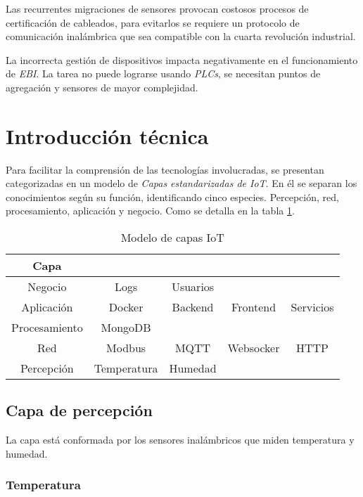 			Las recurrentes migraciones de sensores provocan costosos procesos de certificación de cableados, para evitarlos se requiere un protocolo de comunicación inalámbrica que sea compatible con la cuarta revolución industrial.
			
			La incorrecta gestión de dispositivos impacta negativamente en el funcionamiento de \emph{EBI}. La tarea no puede lograrse usando \emph{PLCs}, se necesitan puntos de agregación y sensores de mayor complejidad.

\section{Introducción técnica}
\label{introTecnica}

	Para facilitar la comprensión de las tecnologías involucradas, se presentan categorizadas en un modelo de \emph{Capas estandarizadas de IoT}. En él se separan los conocimientos según su función, identificando cinco especies. Percepción, red, procesamiento, aplicación y negocio. Como se detalla en la tabla \ref{tab:modeloCapas}.
	
	\begin{table}
		\centering
		\begin{tabular}{c|cccc}
			Capa 			& 				& 			& 			& 			\\ \hline
			Negocio 		& Logs 			& Usuarios 	& 			& 			\\
			Aplicación 		& Docker 		& Backend 	& Frontend	& Servicios	\\
			Procesamiento 	& MongoDB 		& 			& 			& 			\\
			Red 			& Modbus 		& MQTT 		& Websocker & HTTP 		\\
			Percepción 		& Temperatura 	& Humedad 	& 			& 			\\
		\end{tabular}
		\caption{\label{tab:modeloCapas}Modelo de capas IoT}
	\end{table}
	
	\subsection{Capa de percepción}
	\label{capaPercepcion}
	
		La capa está conformada por los sensores inalámbricos que miden temperatura y humedad.
		
		\subsubsection{Temperatura}
		
